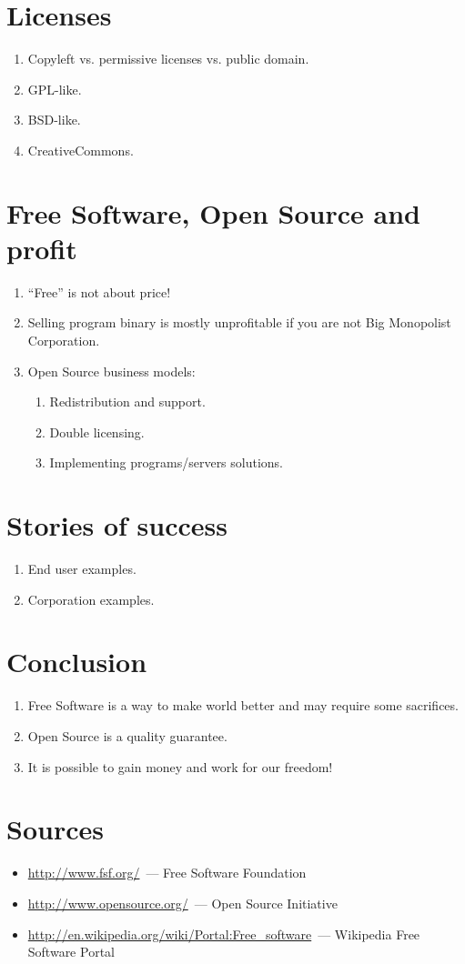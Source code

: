 \documentclass[10pt,a4paper]{article}
\newcommand{\bee}{\begin{enumerate}\setlength{\itemsep}{-0.65mm}}
\newcommand{\ene}{\end{enumerate}}
\newcommand{\bit}{\begin{itemize}\setlength{\itemsep}{-0.65mm}}
\newcommand{\eit}{\end{itemize}}
\begin{document}
\begin{multicols}{2}
\section{Licenses}
\bee
  \item Copyleft vs. permissive licenses vs. public domain.
  \item GPL-like.
  \item BSD-like.
  \item CreativeCommons.
\ene

\section{Free Software, Open Source and profit}
\bee
  \item ``Free'' is not about price!
  \item Selling program binary is mostly unprofitable if you are not Big Monopolist Corporation.
  \item Open Source business models:
  \bee
    \item Redistribution and support.
    \item Double licensing.
    \item Implementing programs/servers solutions.
  \ene
\ene

\section{Stories of success}
\bee
  \item End user examples.
  \item Corporation examples.
\ene

\section{Conclusion}
\bee
  \item Free Software is a way to make world better and may require some 
sacrifices.
  \item Open Source is a quality guarantee.
  \item It is possible to gain money and work for our freedom!
\ene

\end{multicols}

\section*{Sources}
  \bit
    \item \url{http://www.fsf.org/}~--- Free Software Foundation
    \item \url{http://www.opensource.org/}~--- Open Source Initiative
    \item \url{http://en.wikipedia.org/wiki/Portal:Free_software}~--- Wikipedia Free Software Portal
  \eit
\end{document}

